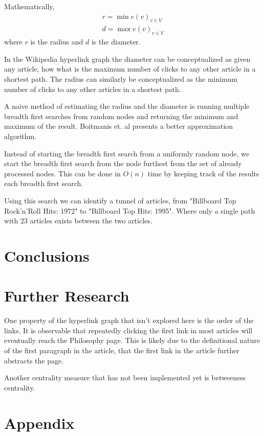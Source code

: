 \documentclass{article}
\begin{document}
Mathematically,
\begin{align*}
    r = \min e(v)_{v \in V} \\
    d = \max e(v)_{v \in V}
\end{align*}
where $r$ is the radius and $d$ is the diameter.

In the Wikipedia hyperlink graph the diameter can be conceptualized as given any article, how what is the maximum number of clicks to any other article in a shortest path. The radius can similarly be conceptualized as the minimum number of clicks to any other articles in a shortest path.


A naive method of estimating the radius and the diameter is running multiple breadth first searches from random nodes and returning the minimum and maximum of the result. Boitmanis et. al presents a better approximation algorithm.

Instead of starting the breadth first search from a uniformly random node, we start the breadth first search from the node furthest from the set of already processed nodes. This can be done in $O(n)$ time by keeping track of the results each breadth first search.

Using this search we can identify a tunnel of articles, from "Billboard Top Rock'n'Roll Hits: 1972" to "Billboard Top Hits: 1995". Where only a single path with 23 articles exists between the two articles.



\section*{Conclusions}


\section{Further Research}

One property of the hyperlink graph that isn't explored here is the order of the links. It is observable that repeatedly clicking the first link in most articles will eventually reach the Philosophy page. This is likely due to the definitional nature of the first paragraph in the article, that the first link in the article further abstracts the page.


Another centrality measure that has not been implemented yet is betweeness centrality.


\section{Appendix}
\end{document}
